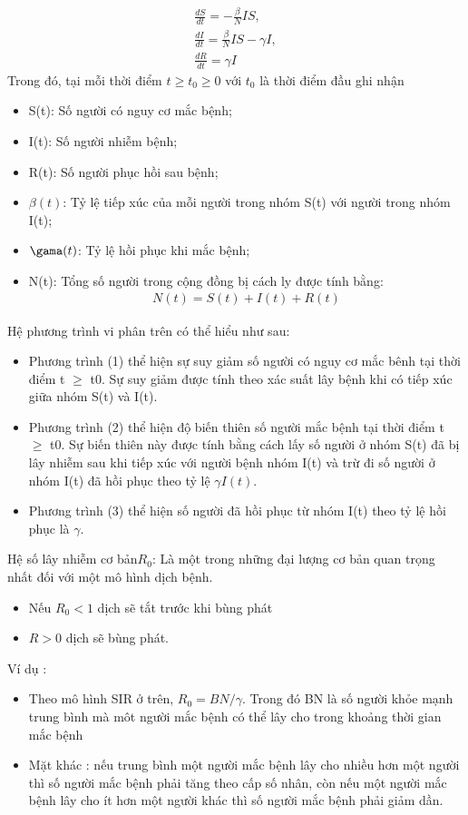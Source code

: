 \documentclass[a4paper]{article}
\begin{document}
\begin{align}
    \frac{dS}{dt} = -\frac{\beta}{N}IS,
    \\
    \frac{dI}{dt} = \frac{\beta}{N}IS - \gamma I,
    \\
    \frac{dR}{dt} = \gamma I
\end{align}
Trong đó, tại mỗi thời điểm $t \geq t_{0} \geq 0$ với $t_{0}$ là thời điểm đầu ghi nhận
\begin{itemize}
    \item S(t): Số người có nguy cơ mắc bệnh;
    \item I(t): Số người nhiễm bệnh;
    \item R(t): Số người phục hồi sau bệnh;
    \item $\beta (t)$: Tỷ lệ tiếp xúc của mỗi người trong nhóm S(t) với người trong nhóm I(t);
    \item $\gama(t)$: Tỷ lệ hồi phục khi mắc bệnh;
    \item N(t): Tổng số người trong cộng đồng bị cách ly được tính bằng:
\begin{align}
    N(t) = S(t) + I(t) + R(t)
\end{align}
\end{itemize}
Hệ phương trình vi phân trên có thể hiểu như sau:
\begin{itemize}
    \item Phương trình (1) thể hiện sự suy giảm số người có nguy cơ mắc bênh tại thời điểm t $\geq$ t0. Sự suy giảm được tính theo xác suất lây bệnh khi có tiếp xúc giữa nhóm S(t) và I(t).
    \item Phương trình (2) thể hiện độ biến thiên số người mắc bệnh tại thời điểm t $\geq$ t0. Sự biến thiên này được tính bằng cách lấy số người ở nhóm S(t) đã bị lây nhiễm sau khi tiếp xúc với người bệnh nhóm I(t) và trừ đi số người ở nhóm I(t) đã hồi phục theo tỷ lệ $\gamma I(t)$.
    \item Phương trình (3) thể hiện số người đã hồi phục từ nhóm I(t) theo tỷ lệ hồi phục là $\gamma$.
\end{itemize}
\newpage
Hệ số lây nhiễm cơ bản$ R_{0}$: Là một trong những đại lượng cơ bản quan trọng nhất đối với một mô hình dịch bệnh.
\begin{itemize}
    \item Nếu $R_{0} < 1$ dịch sẽ tắt trước khi bùng phát
    \item $R > 0$ dịch sẽ bùng phát.
\end{itemize}
Ví dụ :
\begin{itemize}
    \item Theo mô hình SIR ở trên, $R_{0} = BN/\gamma$.
Trong đó BN là số người khỏe mạnh trung bình mà môt người mắc bệnh có thể lây cho trong khoảng thời gian mắc bệnh
    \item Mặt khác : nếu trung bình một người mắc bệnh lây cho nhiều hơn một người thì số người mắc bệnh phải tăng theo cấp số nhân, còn nếu một người mắc bệnh lây cho ít hơn một người khác thì số người mắc bệnh phải giảm dần.
\end{itemize}
\end{document}
